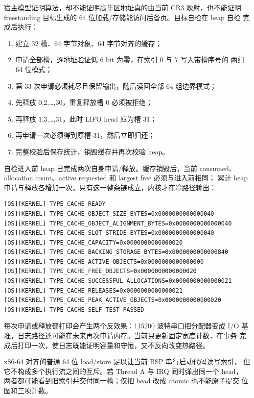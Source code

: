 宿主模型证明算法，却不能证明高半区地址真的由当前 CR3 映射，也不能证明
freestanding 目标生成的 64 位加载/存储能访问后备页。目标自检在 heap 自检
完成后执行：

\begin{enumerate}[label=\arabic*.]
  \item 建立 32 槽、64 字节对象、64 字节对齐的缓存；
  \item 申请全部槽，逐地址验证低 6 bit 为零，在索引 0 与 7 写入带槽序号的
        两组 64 位模式；
  \item 第 33 次申请必须耗尽且保留输出，随后读回全部 64 组边界模式；
  \item 先释放 0,2,\ldots,30，重复释放槽 0 必须被拒绝；
  \item 再释放 1,3,\ldots,31，此时 LIFO head 应为槽 31；
  \item 再申请一次必须得到原槽 31，然后立即归还；
  \item 完整校验后保存统计，销毁缓存并再次校验 heap。
\end{enumerate}

自检进入前 heap 已完成两次自身申请/释放。缓存销毁后，当前 consumed、
allocation count、active requested 和 largest free 必须与进入前相同；
累计 heap 申请与释放各增加一次。只有这一整条链成立，内核才在冷路径输出：

\begin{verbatim}
[OS][KERNEL] TYPE_CACHE_READY
[OS][KERNEL] TYPE_CACHE_OBJECT_SIZE_BYTES=0x0000000000000040
[OS][KERNEL] TYPE_CACHE_OBJECT_ALIGNMENT_BYTES=0x0000000000000040
[OS][KERNEL] TYPE_CACHE_SLOT_STRIDE_BYTES=0x0000000000000040
[OS][KERNEL] TYPE_CACHE_CAPACITY=0x0000000000000020
[OS][KERNEL] TYPE_CACHE_BACKING_STORAGE_BYTES=0x0000000000000840
[OS][KERNEL] TYPE_CACHE_ACTIVE_OBJECTS=0x0000000000000000
[OS][KERNEL] TYPE_CACHE_FREE_OBJECTS=0x0000000000000020
[OS][KERNEL] TYPE_CACHE_SUCCESSFUL_ALLOCATIONS=0x0000000000000021
[OS][KERNEL] TYPE_CACHE_RELEASES=0x0000000000000021
[OS][KERNEL] TYPE_CACHE_PEAK_ACTIVE_OBJECTS=0x0000000000000020
[OS][KERNEL] TYPE_CACHE_SELF_TEST_PASSED
\end{verbatim}

每次申请或释放都打印会产生两个反效果：115200 波特串口把分配器变成 I/O
基准，日志路径还可能在未来再次申请内存。当前只更新固定宽度计数，在事务
完成后打印一次，使日志既能证明容量和守恒，又不反向改变热路径。

x86-64 对齐的普通 64 位 load/store 足以让当前 BSP 串行启动代码读写索引，
但它不构成多个执行流之间的互斥。若 Thread A 与 IRQ 同时弹出同一个 head，
两者都可能看到旧索引并交付同一槽；仅把 head 改成 atomic 也不能原子提交
位图和三项计数。

